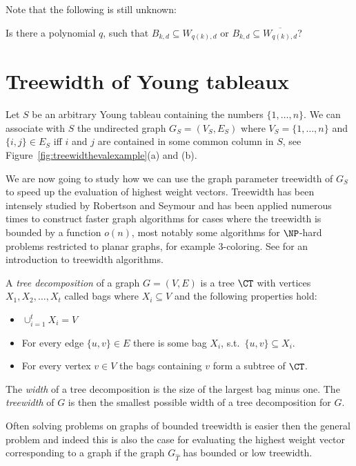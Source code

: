 Note that the following is still unknown:
\begin{question}
    Is there a polynomial $q$, such that $B_{k,d} \subseteq W_{q(k),d}$ or $B_{k,d} \subseteq \overline{W_{q(k),d}}$?
\end{question}

\section{Treewidth of Young tableaux}
\label{sec:treewidth}
Let $S$ be an arbitrary Young tableau containing the numbers $\{1, \ldots, n\}$.
We can associate with $S$ the undirected graph $G_S = (V_S, E_S)$ where $V_S = \{1, \ldots, n\}$ and $\{i, j\} \in E_S$ iff $i$ and $j$ are contained in some common column in $S$, see Figure~\ref{fig:treewidthevalexample}(a) and (b).

We are now going to study how we can use the graph parameter treewidth of $G_S$ to speed up the evaluation of highest weight vectors.
Treewidth has been intensely studied by Robertson and Seymour and has been applied numerous times to construct faster graph algorithms for cases where the treewidth is bounded by a function $o(n)$, most notably some algorithms for $\NP$-hard problems restricted to planar graphs, for example $3$-coloring.
See \cite{cygan2015parameterized} for an introduction to treewidth algorithms.

\begin{definition}\label{def:treedecomp}
    A \emph{tree decomposition} of a graph $G = (V, E)$ is a tree $\CT$ with vertices $X_1, X_2, \ldots, X_t$ called bags where $X_i \subseteq V$ and the following properties hold:
    \begin{itemize}
        \item $\cup_{i=1}^t X_i = V$
        \item For every edge $\{u, v\} \in E$ there is some bag $X_i$, s.t.\ $\{u, v\} \subseteq X_i$.
        \item For every vertex $v \in V$ the bags containing $v$ form a subtree of $\CT$.
    \end{itemize}

    The \emph{width} of a tree decomposition is the size of the largest bag minus one.
    The \emph{treewidth} of $G$ is then the smallest possible width of a tree decomposition for $G$.
\end{definition}

Often solving problems on graphs of bounded treewidth is easier then the general problem and indeed this is also the case for evaluating the highest weight vector corresponding to a graph if the graph $G_{\hat{T}}$ has bounded or low treewidth.

